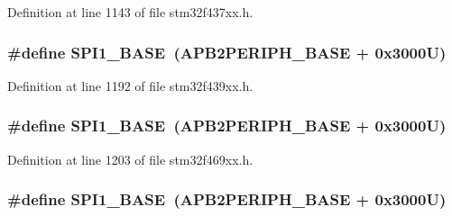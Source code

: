 Definition at line 1143 of file stm32f437xx.\+h.

\subsubsection[{\texorpdfstring{S\+P\+I1\+\_\+\+B\+A\+SE}{SPI1_BASE}}]{\setlength{\rightskip}{0pt plus 5cm}\#define S\+P\+I1\+\_\+\+B\+A\+SE~({\bf A\+P\+B2\+P\+E\+R\+I\+P\+H\+\_\+\+B\+A\+SE} + 0x3000\+U)}\hypertarget{group___peripheral__memory__map_ga50cd8b47929f18b05efbd0f41253bf8d}{}\label{group___peripheral__memory__map_ga50cd8b47929f18b05efbd0f41253bf8d}


Definition at line 1192 of file stm32f439xx.\+h.

\subsubsection[{\texorpdfstring{S\+P\+I1\+\_\+\+B\+A\+SE}{SPI1_BASE}}]{\setlength{\rightskip}{0pt plus 5cm}\#define S\+P\+I1\+\_\+\+B\+A\+SE~({\bf A\+P\+B2\+P\+E\+R\+I\+P\+H\+\_\+\+B\+A\+SE} + 0x3000\+U)}\hypertarget{group___peripheral__memory__map_ga50cd8b47929f18b05efbd0f41253bf8d}{}\label{group___peripheral__memory__map_ga50cd8b47929f18b05efbd0f41253bf8d}


Definition at line 1203 of file stm32f469xx.\+h.

\subsubsection[{\texorpdfstring{S\+P\+I1\+\_\+\+B\+A\+SE}{SPI1_BASE}}]{\setlength{\rightskip}{0pt plus 5cm}\#define S\+P\+I1\+\_\+\+B\+A\+SE~({\bf A\+P\+B2\+P\+E\+R\+I\+P\+H\+\_\+\+B\+A\+SE} + 0x3000\+U)}\hypertarget{group___peripheral__memory__map_ga50cd8b47929f18b05efbd0f41253bf8d}{}\label{group___peripheral__memory__map_ga50cd8b47929f18b05efbd0f41253bf8d}



